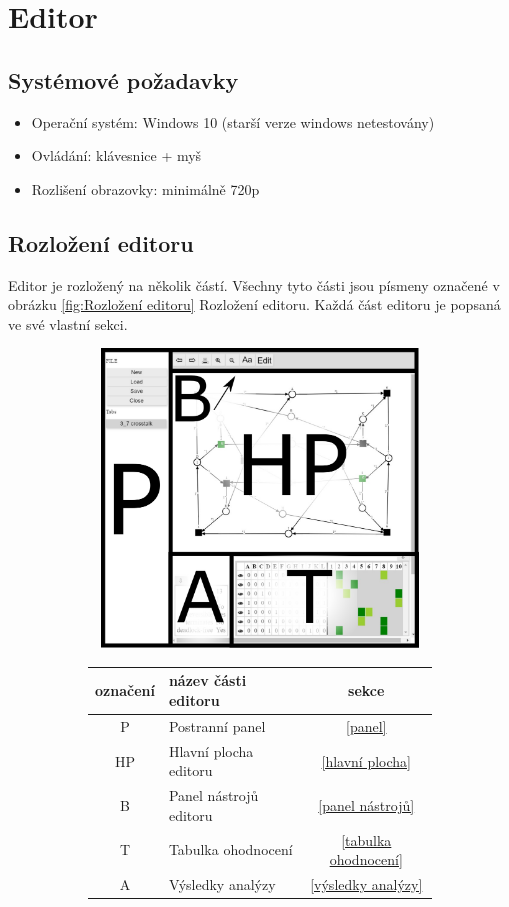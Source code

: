 \documentclass[
  biblatex,
  glossaries,
  printversion
]{kidiplom}
\begin{document}
\clearpage
\section{Editor}
\subsection{Systémové požadavky}
\begin{itemize}
  \item Operační systém: Windows 10 (starší verze windows netestovány)
  \item Ovládání: klávesnice + myš
  \item Rozlišení obrazovky: minimálně 720p
\end{itemize}

  
\subsection{Rozložení editoru}
Editor je rozložený na několik částí. Všechny tyto části 
jsou písmeny označené v
obrázku \ref{fig:Rozložení editoru} 
Rozložení editoru. Každá část editoru je popsaná ve své vlastní sekci.

\begin{figure}[h]
  \centering
  \begin{subfigure}[h]{350px}
    \includegraphics[height=300px, width=350px]{full_image_splited}
  \end{subfigure}
  \caption{Rozložení editoru}
  \label{fig:Rozložení editoru}
  \begin{subfigure}[h]{0.55\textwidth}
    \begin{tabular}{|c l c|}
      \hline
      označení &      název části editoru &    sekce \\
      \hline
      \hline
      P &             Postranní panel&  \ref{panel} \\
      HP &            Hlavní plocha editoru&  \ref{hlavní plocha} \\
      B &             Panel nástrojů editoru &  \ref{panel nástrojů} \\
      T &             Tabulka ohodnocení &  \ref{tabulka ohodnocení} \\
      A &             Výsledky analýzy &  \ref{výsledky analýzy} \\
      \hline
    \end{tabular}
  \end{subfigure}
\end{figure}
\end{document}
